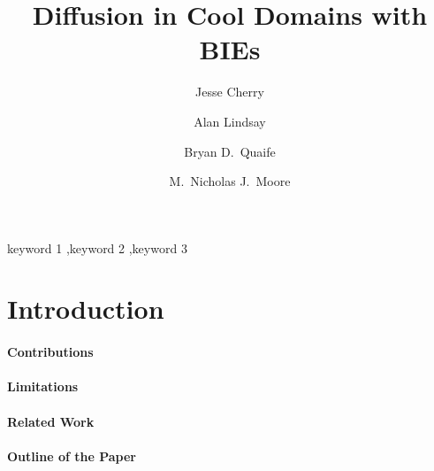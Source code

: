 \documentclass[preprint, 10pt]{elsarticle}
\begin{document}
\title{Diffusion in Cool Domains with BIEs}

\author[Bryan1]{Jesse Cherry}
\author[Alan]{Alan Lindsay}
\author[Bryan1,Bryan2]{Bryan D.~Quaife}
\author[Nick]{M.~Nicholas J.~Moore}

\address[Nick]{Department of Mathematics, United States Naval Academy,
Annapolis, MD, 21402.}
\address[Bryan1]{Department of Scientific Computing, Florida State University, Tallahassee, FL, 32306.}
\address[Bryan2]{Geophysical Fluid Dynamics Institute, Florida State
University, Tallahassee, FL, 32306.}
\address[Alan]{Department of Applied \& Computational Math \&
Statistics, University of Notre Dame, South Bend, IN, 46656.}

\begin{abstract} 
\end{abstract}

\begin{keyword}
  keyword 1 \sep keyword 2 \sep keyword 3 
\end{keyword}

\maketitle

\section{Introduction\label{s:intro}}

\cite{chi-moo-qua2020}
\cite{qua-moo2018}
\cite{lub-sch1992}


\paragraph{Contributions}


\paragraph{Limitations}

\paragraph{Related Work}

\paragraph{Outline of the Paper}
\end{document}
